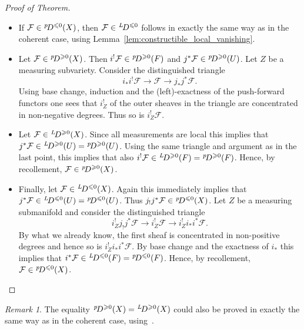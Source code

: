 \documentclass{compositio}
\theoremstyle{plain}
\theoremstyle{definition}
\theoremstyle{remark}
\newtheorem{Rem}[Thm]{Remark}
\newcommand\sheaf{\mathcal}
\newcommand\perv[1][p]{\mkern1mu{}^{#1}\mkern-3mu}
\begin{document}
\begin{proof}[Proof of Theorem]
    \begin{itemize}
        \item 
            If $\sheaf F \in  \perv D^{\leq 0}(X)$, then $\sheaf F \in  \perv[L] D^{\leq 0}$ follows in exactly the same way as in the coherent case, using Lemma~\ref{lem:constructible_local_vanishing}.
        \item 
            Let $\sheaf F \in  \perv D^{\geq 0}(X)$.
            Then $i^! \sheaf F \in  \perv D^{\geq 0}(F)$ and $j^*\sheaf F \in  \perv D^{\geq 0}(U)$.
            Let $Z$ be a measuring subvariety.
            Consider the distinguished triangle 
            \[ 
                i_*i^! \sheaf F \to  \sheaf F \to  j_*j^*\sheaf F.
            \]
            Using base change, induction and the (left)-exactness of the push-forward functors one sees that $i_Z^!$ of the outer sheaves in the triangle are concentrated in non-negative degrees.
            Thus so is $i_Z^! \sheaf F$.
        \item 
            Let $\sheaf F \in  \perv[L] D^{\geq 0}(X)$.
            Since all measurements are local this implies that $j^* \sheaf F \in  \perv[L] D^{\geq 0}(U) = \perv D^{\geq 0}(U)$.
            Using the same triangle and argument as in the last point, this implies that also $i^! \sheaf F \in  \perv[L] D^{\geq 0}(F) = \perv D^{\geq 0}(F)$.
            Hence, by recollement, $\sheaf F \in  \perv D^{\geq 0}(X)$.
        \item 
            Finally, let $\sheaf F \in  \perv[L] D^{\leq 0}(X)$.
            Again this immediately implies that $j^* \sheaf F \in  \perv[L] D^{\leq 0}(U) = \perv D^{\leq 0}(U)$.
            Thus $j_!j^*\sheaf F \in  \perv D^{\leq 0}(X)$.
            Let $Z$ be a measuring submanifold and consider the distinguished triangle
            \[
                i_Z^! j_!j^*\sheaf F \to  i_Z^! \sheaf F \to  i_Z^! i_*i^* \sheaf F.
            \]
            By what we already know, the first sheaf is concentrated in non-positive degrees and hence so is $i_Z^! i_*i^* \sheaf F$.
            By base change and the exactness of $i_*$ this implies that $i^* \sheaf F \in  \perv[L] D^{\leq 0}(F) = \perv D^{\leq 0}(F)$.
            Hence, by recollement, $\sheaf F \in  \perv D^{\leq 0}(X)$.
            \qedhere
    \end{itemize}
\end{proof}

\begin{Rem}
    The equality $\perv D^{\geq 0}(X) = \perv[L]D^{\geq 0}(X)$ could also be proved in exactly the same way as in the coherent case, using~\cite[Exercise~X.10]{KashiwaraSchapira:1994:SheavesOnManifolds}.
\end{Rem}

\printbibliography
\end{document}
